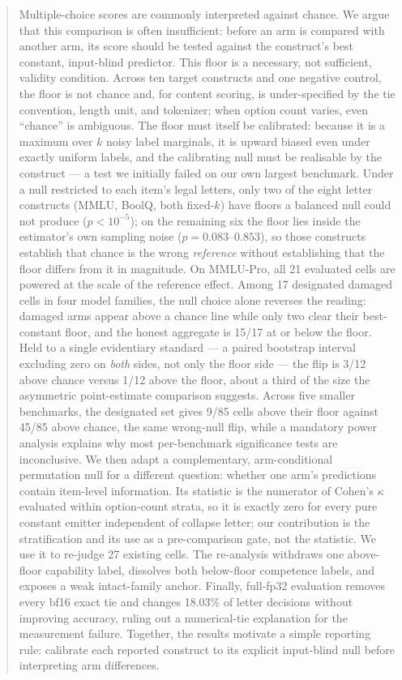 \begin{abstract}
Multiple-choice scores are commonly interpreted against chance. We argue that this comparison is often insufficient: before an arm is compared with another arm, its score should be tested against the construct's best constant, input-blind predictor. This floor is a necessary, not sufficient, validity condition. Across ten target constructs and one negative control, the floor is not chance and, for content scoring, is under-specified by the tie convention, length unit, and tokenizer; when option count varies, even ``chance'' is ambiguous. The floor must itself be calibrated: because it is a maximum over $k$ noisy label marginals, it is upward biased even under exactly uniform labels, and the calibrating null must be realisable by the construct --- a test we initially failed on our own largest benchmark. Under a null restricted to each item's legal letters, only two of the eight letter constructs (MMLU, BoolQ, both fixed-$k$) have floors a balanced null could not produce ($p<10^{-5}$); on the remaining six the floor lies inside the estimator's own sampling noise ($p=0.083$--$0.853$), so those constructs establish that chance is the wrong \emph{reference} without establishing that the floor differs from it in magnitude. On MMLU-Pro, all 21 evaluated cells are powered at the scale of the reference effect. Among 17 designated damaged cells in four model families, the null choice alone reverses the reading: damaged arms appear above a chance line while only two clear their best-constant floor, and the honest aggregate is 15/17 at or below the floor. Held to a single evidentiary standard --- a paired bootstrap interval excluding zero on \emph{both} sides, not only the floor side --- the flip is 3/12 above chance versus 1/12 above the floor, about a third of the size the asymmetric point-estimate comparison suggests. Across five smaller benchmarks, the designated set gives 9/85 cells above their floor against 45/85 above chance, the same wrong-null flip, while a mandatory power analysis explains why most per-benchmark significance tests are inconclusive. We then adapt a complementary, arm-conditional permutation null for a different question: whether one arm's predictions contain item-level information. Its statistic is the numerator of Cohen's $\kappa$ evaluated within option-count strata, so it is exactly zero for every pure constant emitter independent of collapse letter; our contribution is the stratification and its use as a pre-comparison gate, not the statistic. We use it to re-judge 27 existing cells. The re-analysis withdraws one above-floor capability label, dissolves both below-floor competence labels, and exposes a weak intact-family anchor. Finally, full-fp32 evaluation removes every bf16 exact tie and changes 18.03\% of letter decisions without improving accuracy, ruling out a numerical-tie explanation for the measurement failure. Together, the results motivate a simple reporting rule: calibrate each reported construct to its explicit input-blind null before interpreting arm differences.
\end{abstract}
